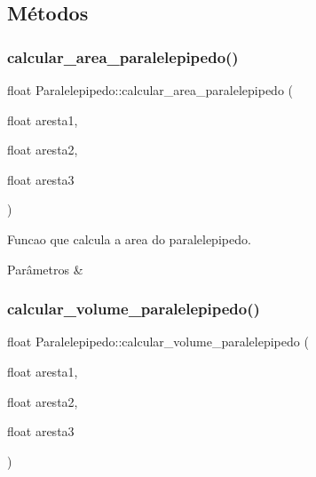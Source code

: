 \subsection{Métodos}
\mbox{\label{classParalelepipedo_a1715462a8d3456c1d0df0b7a0bd37242}} 
\subsubsection{\texorpdfstring{calcular\+\_\+area\+\_\+paralelepipedo()}{calcular\_area\_paralelepipedo()}}
{\footnotesize\ttfamily float Paralelepipedo\+::calcular\+\_\+area\+\_\+paralelepipedo (\begin{DoxyParamCaption}\item[{float}]{aresta1,  }\item[{float}]{aresta2,  }\item[{float}]{aresta3 }\end{DoxyParamCaption})}



Funcao que calcula a area do paralelepipedo. 


\begin{DoxyParams}{Parâmetros}
{\em } & \\
\hline
\end{DoxyParams}
\mbox{\label{classParalelepipedo_ae5be025ecab123eec36e7831025d39c7}} 
\subsubsection{\texorpdfstring{calcular\+\_\+volume\+\_\+paralelepipedo()}{calcular\_volume\_paralelepipedo()}}
{\footnotesize\ttfamily float Paralelepipedo\+::calcular\+\_\+volume\+\_\+paralelepipedo (\begin{DoxyParamCaption}\item[{float}]{aresta1,  }\item[{float}]{aresta2,  }\item[{float}]{aresta3 }\end{DoxyParamCaption})}



